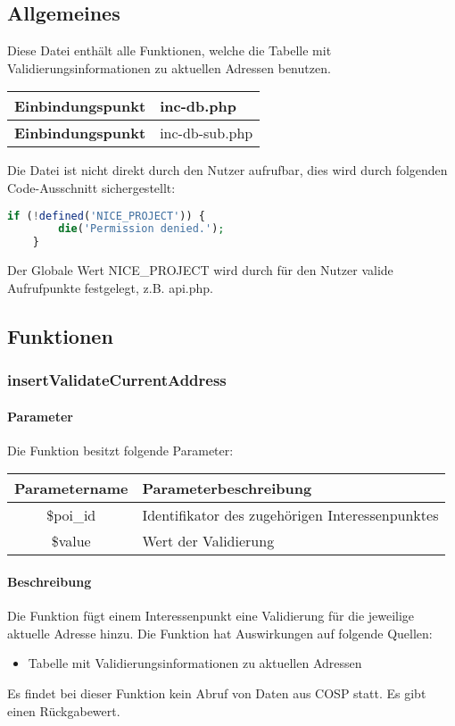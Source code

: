 \subsection{Allgemeines} Diese Datei enthält alle Funktionen, welche die Tabelle mit Validierungsinformationen zu aktuellen Adressen benutzen.
\begin{table}[H]
	\begin{tabular}{|c|p{11cm}|}
		\hline
		\textbf{Einbindungspunkt} & inc-db.php \\ \hline
		\textbf{Einbindungspunkt} & inc-db-sub.php \\ \hline
	\end{tabular}
\end{table}
Die Datei ist nicht direkt durch den Nutzer aufrufbar, dies wird durch folgenden Code-Ausschnitt sichergestellt:
\begin{lstlisting}[language=php]
	if (!defined('NICE_PROJECT')) {
		die('Permission denied.');
	}
\end{lstlisting}
Der Globale Wert {\glqq NICE\_PROJECT\grqq} wird durch für den Nutzer valide Aufrufpunkte festgelegt, z.B. {\glqq api.php\grqq}.
\newpage
\subsection{Funktionen}
\subsubsection{insertValidateCurrentAddress}
\paragraph{Parameter} Die Funktion besitzt folgende Parameter:
\begin{table}[H]
	\begin{tabular}{|c|p{11cm}|}
		\hline
		\textbf{Parametername} & \textbf{Parameterbeschreibung} \\ \hline
		\$poi\_id & Identifikator des zugehörigen Interessenpunktes \\ \hline
		\$value   & Wert der Validierung \\ \hline
	\end{tabular}
\end{table}
\paragraph{Beschreibung} Die Funktion fügt einem Interessenpunkt eine Validierung für die jeweilige aktuelle Adresse hinzu. Die Funktion hat Auswirkungen auf folgende Quellen:
\begin{itemize}
	\item Tabelle mit Validierungsinformationen zu aktuellen Adressen
\end{itemize}
Es findet bei dieser Funktion kein Abruf von Daten aus {\glqq COSP\grqq} statt. Es gibt einen Rückgabewert.
